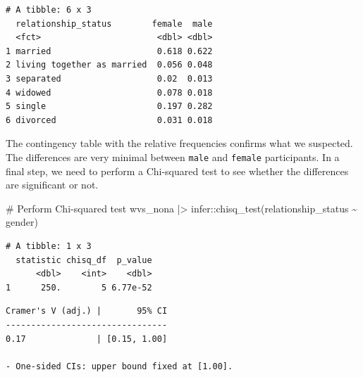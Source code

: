 \documentclass[
  letterpaper,
  DIV=11,
  numbers=noendperiod]{scrreprt}
\newenvironment{Shaded}{\begin{snugshade}}{\end{snugshade}}
\newcommand{\AttributeTok}[1]{\textcolor[rgb]{0.40,0.45,0.13}{#1}}
\newcommand{\CommentTok}[1]{\textcolor[rgb]{0.37,0.37,0.37}{#1}}
\newcommand{\FunctionTok}[1]{\textcolor[rgb]{0.28,0.35,0.67}{#1}}
\newcommand{\NormalTok}[1]{\textcolor[rgb]{0.00,0.23,0.31}{#1}}
\newcommand{\OtherTok}[1]{\textcolor[rgb]{0.00,0.23,0.31}{#1}}
\newcommand{\SpecialCharTok}[1]{\textcolor[rgb]{0.37,0.37,0.37}{#1}}
\newcommand{\StringTok}[1]{\textcolor[rgb]{0.13,0.47,0.30}{#1}}
\begin{document}
\begin{verbatim}
# A tibble: 6 x 3
  relationship_status        female  male
  <fct>                       <dbl> <dbl>
1 married                     0.618 0.622
2 living together as married  0.056 0.048
3 separated                   0.02  0.013
4 widowed                     0.078 0.018
5 single                      0.197 0.282
6 divorced                    0.031 0.018
\end{verbatim}

The contingency table with the relative frequencies confirms what we
suspected. The differences are very minimal between \texttt{male} and
\texttt{female} participants. In a final step, we need to perform a
Chi-squared test to see whether the differences are significant or not.

\begin{Shaded}
\begin{Highlighting}[]
\CommentTok{\# Perform Chi{-}squared test}
\NormalTok{wvs\_nona }\SpecialCharTok{|\textgreater{}}\NormalTok{ infer}\SpecialCharTok{::}\FunctionTok{chisq\_test}\NormalTok{(relationship\_status }\SpecialCharTok{\textasciitilde{}}\NormalTok{ gender)}
\end{Highlighting}
\end{Shaded}

\begin{verbatim}
# A tibble: 1 x 3
  statistic chisq_df  p_value
      <dbl>    <int>    <dbl>
1      250.        5 6.77e-52
\end{verbatim}

\begin{Shaded}
\end{Shaded}

\begin{verbatim}
Cramer's V (adj.) |       95% CI
--------------------------------
0.17              | [0.15, 1.00]

- One-sided CIs: upper bound fixed at [1.00].
\end{verbatim}

\begin{Shaded}
\end{Shaded}
\end{document}
